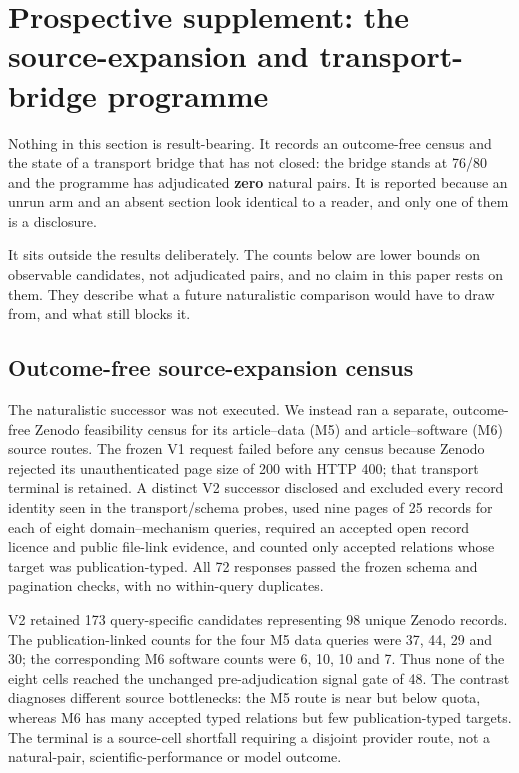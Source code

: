 \section{Prospective supplement: the source-expansion and transport-bridge programme}
\label{sec:prospective-source-expansion}

Nothing in this section is result-bearing. It records an outcome-free census and
the state of a transport bridge that has not closed: the bridge stands at 76/80
and the programme has adjudicated \textbf{zero} natural pairs. It is reported
because an unrun arm and an absent section look identical to a reader, and only
one of them is a disclosure.

It sits outside the results deliberately. The counts below are lower bounds on
observable candidates, not adjudicated pairs, and no claim in this paper rests
on them. They describe what a future naturalistic comparison would have to draw
from, and what still blocks it.

\subsection{Outcome-free source-expansion census}
The naturalistic successor was not executed.  We instead ran a separate,
outcome-free Zenodo feasibility census for its article--data (M5) and
article--software (M6) source routes.  The frozen V1 request failed before any
census because Zenodo rejected its unauthenticated page size of 200 with HTTP
400; that transport terminal is retained.  A distinct V2 successor disclosed
and excluded every record identity seen in the transport/schema probes, used
nine pages of 25 records for each of eight domain--mechanism queries, required
an accepted open record licence and public file-link evidence, and counted only
accepted relations whose target was publication-typed.  All 72 responses passed
the frozen schema and pagination checks, with no within-query duplicates.

V2 retained 173 query-specific candidates representing 98 unique Zenodo
records.  The publication-linked counts for the four M5 data queries were 37,
44, 29 and 30; the corresponding M6 software counts were 6, 10, 10 and 7.
Thus none of the eight cells reached the unchanged pre-adjudication signal gate
of 48.  The contrast diagnoses different source bottlenecks: the M5 route is
near but below quota, whereas M6 has many accepted typed relations but few
publication-typed targets.  The terminal is a source-cell shortfall requiring a
disjoint provider route, not a natural-pair, scientific-performance or model
outcome.

